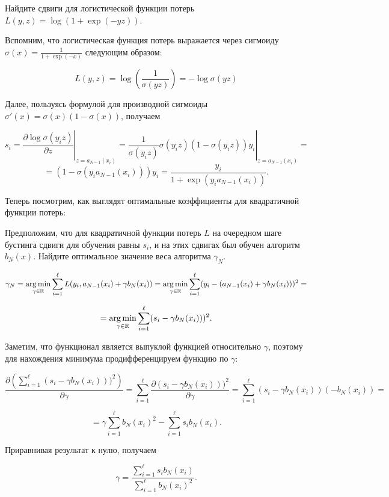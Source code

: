 \documentclass[12pt,fleqn]{article}
\begin{document}
\begin{vkProblem}
Найдите сдвиги для логистической функции потерь \\
$L(y, z) = \log (1 + \exp(-yz))$.
\end{vkProblem}
\begin{esSolution}
Вспомним, что логистическая функция потерь выражается через сигмоиду $\sigma(x) 
= \frac{1}{1 + \exp(-x)}$ следующим образом:

\[
    L(y, z) = \log \left( \frac{1}{\sigma(yz)} \right) = -\log \sigma(yz)
\]

Далее, пользуясь формулой для производной сигмоиды $\sigma'(x) = \sigma(x)(1 - 
\sigma(x))$, получаем

\[
    s_i = \left. \frac{\partial \log \sigma(y_i z)}{\partial z} 
        \right|_{z=a_{N-1}(x_i)} =
    \left. \frac{1}{\sigma(y_i z)} \sigma(y_i z) (1 - \sigma(y_i z)) y_i
        \right|_{z=a_{N-1}(x_i)} =
\]
\[
    = (1-\sigma(y_i a_{N-1}(x_i))) y_i =
    \frac{y_i}{1 + \exp(y_i a_{N-1}(x_i))}.
\]

\end{esSolution}

Теперь посмотрим, как выглядят оптимальные коэффициенты для квадратичной функции потерь:

\begin{vkProblem}
Предположим, что для квадратичной функции потерь $ L$ на очередном шаге бустинга сдвиги для обучения равны $s_i$, и на этих сдвигах был обучен алгоритм $b_N(x)$. Найдите 
оптимальное значение веса алгоритма $\gamma_N$.
\end{vkProblem}
\begin{esSolution}

\[
    \gamma_N = \mathop{\rm arg\,min}\limits_{\gamma \in \mathbb{R}} \sum_{i=1}^{\ell} L(y_i, a_{N-1}(x_i) + 
        \gamma b_N (x_i)) =
    \mathop{\rm arg\,min}\limits_{\gamma \in \mathbb{R}}\sum_{i=1}^\ell (y_i - (a_{N-1}(x_i) + \gamma b_N (x_i)))^2 =
\]

\[
    = \mathop{\rm arg\,min}\limits_{\gamma \in \mathbb{R}}\sum_{i=1}^\ell (s_i - \gamma b_N (x_i)))^2.
\]

Заметим, что функционал является выпуклой функцией относительно $\gamma$, поэтому для нахождения минимума продифференцируем функцию по $\gamma$:

\[
    \frac{\partial \left(\sum_{i=1}^\ell (s_i - \gamma b_N (x_i)))^2 \right) }
        {\partial \gamma} =
    \sum_{i=1}^\ell \frac{\partial (s_i - \gamma b_N (x_i)))^2}{\partial 
    \gamma} =
    \sum_{i=1}^\ell (s_i - \gamma b_N(x_i)) (- b_N(x_i)) =
\]

\[
    = \gamma \sum_{i=1}^\ell b_N(x_i)^2 - \sum_{i=1}^\ell s_i b_N(x_i).
\]

Приравнивая результат к нулю, получаем

\[
    \gamma = \frac{\sum_{i=1}^\ell s_i b_N(x_i)}{\sum_{i=1}^\ell b_N(x_i)^2}.
\]

\end{esSolution}
\end{document}
